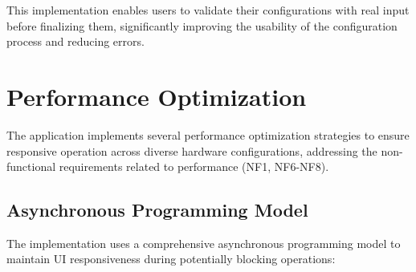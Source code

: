 This implementation enables users to validate their configurations with real input before finalizing them, significantly improving the usability of the configuration process and reducing errors.

\section{Performance Optimization}
The application implements several performance optimization strategies to ensure responsive operation across diverse hardware configurations, addressing the non-functional requirements related to performance (NF1, NF6-NF8).

\subsection{Asynchronous Programming Model}
The implementation uses a comprehensive asynchronous programming model to maintain UI responsiveness during potentially blocking operations:

